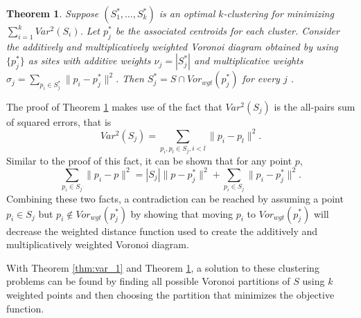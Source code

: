 \documentclass[a4paper, 11pt]{article}
\newtheorem{theorem}{Theorem}[section]
\begin{document}
\begin{theorem}
  \label{thm:var_2}
  Suppose $(S_1^\ast, \dots, S_k^\ast)$ is an optimal $k$-clustering for minimizing $\sum_{i=1}^k Var^2(S_i)$. Let $p_j^\ast$ be the associated
  centroids for each cluster. Consider the additively and multiplicatively weighted Voronoi diagram obtained by using $\{ p_j^\ast \}$ as sites with
  additive weights $\nu_j = |S_j^\ast|$ and multiplicative weights $\sigma_j = \sum_{p_i \in S_j^\ast} \| p_i - p_j^\ast \|^2$. Then $S_j^\ast =
  S \cap Vor_{wgt}(p_j^\ast)$ for every $j$ \cite{inaba_clustering}.
\end{theorem}

The proof of Theorem \ref{thm:var_2} makes use of the fact that $Var^2(S_j)$ is the all-pairs sum of squared errors, that is
\begin{equation}
  Var^2(S_j) = \sum_{p_i, p_l \in S_j, i<l} \|p_i - p_l\|^2.
  \label{eq:all_sums}
\end{equation}
Similar to the proof of this fact, it can be shown that for any point $p$,
\begin{equation}
  \sum_{p_i \in S_j} \| p_i - p \|^2 = |S_j| \|p - p_j^\ast\|^2 + \sum_{p_i \in S_j} \| p_i - p_j^\ast \|^2.
  \label{eq:wgt_vor}
\end{equation}
Combining these two facts, a contradiction can be reached by assuming a point $p_i \in S_j$ but $p_i \not\in Vor_{wgt}(p_j^\ast)$ by showing that
moving $p_i$ to $Vor_{wgt}(p_j^\ast)$ will decrease the weighted distance function used to create the additively and multiplicatively weighted Voronoi
diagram.

With Theorem \ref{thm:var_1} and Theorem \ref{thm:var_2}, a solution to these clustering problems can be found by finding all possible Voronoi
partitions of $S$ using $k$ weighted points and then choosing the partition that minimizes the objective function.

\printbibliography
\end{document}
